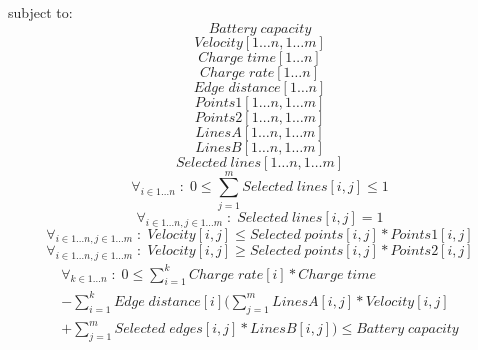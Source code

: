 subject to:
\begin{equation}
Battery\;capacity
\end{equation}
\begin{equation}
Velocity[1 \dots n,1 \dots m]
\end{equation}
\begin{equation}
Charge\;time[1 \dots n]
\end{equation}
\begin{equation}
Charge\;rate[1 \dots n]
\end{equation}
\begin{equation}
Edge\;distance[1 \dots n]
\end{equation}
\begin{equation}
Points1[1 \dots n,1 \dots m]
\end{equation}
\begin{equation}
Points2[1 \dots n,1 \dots m]
\end{equation}
\begin{equation}
LinesA[1 \dots n,1 \dots m]
\end{equation}
\begin{equation}
LinesB[1 \dots n,1 \dots m]
\end{equation}
\begin{equation}
Selected\;lines[1 \dots n,1 \dots m]
\end{equation}
\begin{equation}
\forall_{i\in1 \dots n }\;:\;0\le \sum_{j=1}^{m} Selected\;lines[i,j] \le 1
\end{equation}
\begin{equation}
\forall_{i\in1 \dots n, j \in 1 \dots m} \;:\; Selected\;lines[i,j] = 1
\end{equation}
\begin{equation}
\forall_{i\in1 \dots n, j \in 1 \dots m}\;:\;Velocity[i,j] \le Selected\;points[i,j] * Points1[i,j]
\end{equation}
\begin{equation}
\forall_{i\in1 \dots n, j \in 1 \dots m}\;:\;Velocity[i,j] \ge Selected\;points[i,j] * Points2[i,j]
\end{equation}
\begin{equation}
\begin{split}
\forall_{k\in1 \dots n}\;:\;0 \le\sum_{i=1}^{k}Charge\;rate[i]*Charge\;time\\
-\sum_{i=1}^{k} Edge\; distance[i](\sum_{j=1}^{m} LinesA[i,j]*Velocity[i,j]\\
+\sum_{j=1}^{m} Selected\;edges[i,j]*LinesB[i,j]) \le Battery\;capacity
\end{split}
\end{equation}

